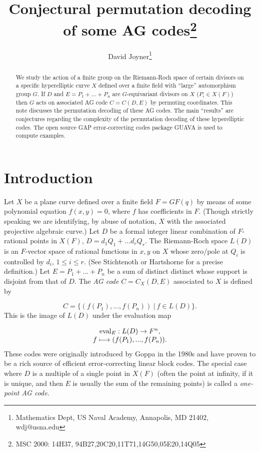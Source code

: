 \documentclass[12pt]{article}
\numberwithin{equation}{section}
\def\eval{{\rm{eval}}}
\begin{document}
\author{David Joyner\thanks{Mathematics Dept, 
US Naval Academy, Annapolis, MD 21402,
wdj@usna.edu}}

\title{Conjectural permutation decoding of some AG 
codes\thanks{MSC 2000: 
14H37, 94B27,20C20,11T71,14G50,05E20,14Q05}}

\maketitle

\begin{abstract}
We study the action of a finite group on the Riemann-Roch
space of certain divisors on a specific hyperelliptic curve
$X$ defined over a finite field with ``large'' automorphism group
$G$. If $D$ and $E=P_1+...+P_n$ 
are $G$-equivariant divisors on $X$ ($P_i\in X(F)$)
then $G$ acts on associated AG code $C=C(D,E)$ 
by permuting coordinates.
This note discusses the permutation decoding of these AG codes.
The main ``results'' are conjectures regarding the complexity of 
the permutation decoding of these hyperelliptic codes. 
The open source GAP error-correcting codes package GUAVA
is used to compute examples.
\end{abstract}


\section{Introduction}

Let $X$ be a plane curve defined over a finite field
$F=GF(q)$ by means of some polynomial equation $f(x,y)=0$,
where $f$ has coefficients in $F$.
(Though strictly speaking we are identifying,
by abuse of notation, $X$ with the associated projective 
algebraic curve.) 
Let $D$ be a formal integer linear
combination of $F$-rational
points in $X(F)$, 
$D=d_1Q_1+...d_rQ_r$. The Riemann-Roch
space $L(D)$ is an $F$-vector space of rational functions 
in $x,y$ on $X$ whose zero/pole at $Q_i$ is
controlled by $d_i$, $1\leq i\leq r$. (See Stichtenoth
\cite{Sti} or Hartshorne \cite{H} for a precise definition.)
Let $E=P_1+...+P_n$ be a sum of distinct distinct 
whose support is disjoint from that of $D$. 
The {\it AG code} $C=C_X(D,E)$ associated to $X$ is 
defined by 

\begin{equation}
\label{eqn:AGcode}
C=\{(f(P_1),...,f(P_n))\ |\ f\in L(D)\}.
\end{equation}
This is the image of $L(D)$ under the evaluation map

\begin{equation}
\label{eqn:eval}
\begin{array}{c}
\eval_E:L(D)\rightarrow F^n,\\
f \longmapsto (f(P_1),...,f(P_n)).
\end{array}
\end{equation}
These codes were originally introduced by Goppa in the 
1980s and have proven to be a rich source of 
efficient error-correcting linear block codes.
The special case where $D$ is a multiple of a single 
point in $X(F)$ (often the point at infinity, if
it is unique, and then $E$ is usually the sum of the remaining 
points) is called a {\it one-point AG code}.
\end{document}
